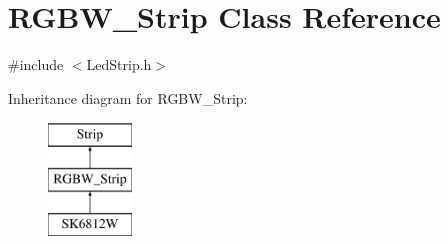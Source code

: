 \hypertarget{classRGBW__Strip}{}\section{R\+G\+B\+W\+\_\+\+Strip Class Reference}
\label{classRGBW__Strip}


{\ttfamily \#include $<$Led\+Strip.\+h$>$}

Inheritance diagram for R\+G\+B\+W\+\_\+\+Strip\+:\begin{figure}[H]
\begin{center}
\leavevmode
\includegraphics[height=3.000000cm]{classRGBW__Strip}
\end{center}
\end{figure}
